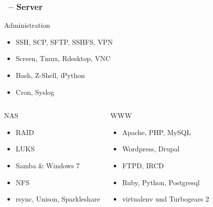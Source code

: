 \documentclass[utf8]{beamer}
\begin{document}
\begin{frame}
  \frametitle{\insertsectionhead\ -- Server}

\begin{block}{Administration}
  \begin{itemize}
    \item SSH, SCP, SFTP, SSHFS, VPN
    \item Screen, Tmux, Rdesktop, VNC
    \item Bash, Z-Shell, iPython
    \item Cron, Syslog
  \end{itemize}
\end{block}

\begin{columns}
\begin{block}{NAS}
  \begin{itemize}
    \item RAID
    \item LUKS
    \item Samba \& Windows 7
    \item NFS
    \item rsync, Unison, Sparkleshare
  \end{itemize}
\end{block}

\begin{block}{WWW}
  \begin{itemize}
    \item Apache, PHP, MySQL
    \item Wordpress, Drupal
    \item FTPD, IRCD
    \item Ruby, Python, Postgresql
    \item virtualenv und Turbogears 2
  \end{itemize}
\end{block}
\end{columns}
\end{frame}
\end{document}
